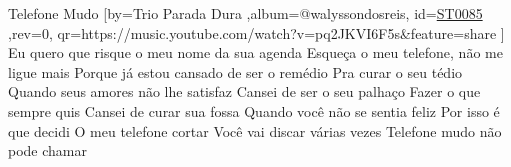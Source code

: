 \beginsong
{Telefone Mudo %
}[by={Trio Parada Dura %
},album={@walyssondosreis},
id={\href{https://music.youtube.com/watch?v=pq2JKVI6F5s&feature=share %
}{ST0085 %
}},rev={0}, %
qr={https://music.youtube.com/watch?v=pq2JKVI6F5s&feature=share %
}]
\beginverse
Eu quero que risque o meu nome da sua agenda
Esqueça o meu telefone, não me ligue mais
Porque já estou cansado de ser o remédio
Pra curar o seu tédio
Quando seus amores não lhe satisfaz
\endverse
\beginverse
Cansei de ser o seu palhaço
Fazer o que sempre quis
Cansei de curar sua fossa
Quando você não se sentia feliz
\endverse
\beginverse
Por isso é que decidi
O meu telefone cortar
Você vai discar várias vezes
Telefone mudo não pode chamar
\endverse

